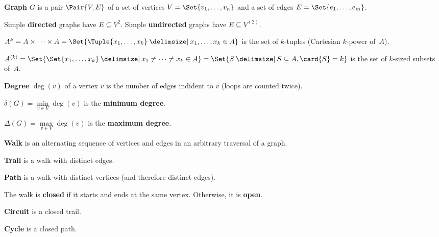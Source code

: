 \documentclass[a4paper,12pt]{article}
\newcommand{\op}[1]{\operatorname*{#1}}
\newcommand{\degree}[1]{\op{deg}(#1)}
\newcommand{\minDegree}[1]{\delta(#1)}
\newcommand{\maxDegree}[1]{\Delta(#1)}
\begin{document}
\begin{terms}
    \item \textbf{Graph} $G$ is a pair $\Pair{V, E}$ of a set of vertices $V = \Set{v_1,\dotsc,v_n}$ and a set of edges $E = \Set{e_1,\dotsc,e_m}$.

    \item Simple \textbf{directed} graphs have $E \subseteq V^{2}$. Simple \textbf{undirected} graphs have $E \subseteq V^{(2)}$.

    \begin{terms}
        \item $A^k = A \times \dotsb \times A = \Set{\Tuple{x_1,\dotsc,x_k} \given x_1,\dotsc,x_k \in A}$ is the set of $k$-tuples (Cartesian $k$-power of~$A$).

        \item $A^{(k)} = \Set{\Set{x_1,\dotsc,x_k} \given x_1 \neq \dotsb \neq x_k \in A} = \Set{ S \given S \subseteq A, \card{S} = k }$ is the set of $k$-sized subsets of~$A$.
    \end{terms}

    \item \textbf{Degree} $\degree{v}$ of a vertex $v$ is the number of edges indident to $v$ (loops are counted twice).
    \begin{terms}
        \item $\minDegree{G} = \min\limits_{v \in V} \degree{v}$ is the \textbf{minimum degree}.
        \item $\maxDegree{G} = \max\limits_{v \in V} \degree{v}$ is the \textbf{maximum degree}.
    \end{terms}


    \item \textbf{Walk} is an alternating sequence of vertices and edges in an arbitrary traversal of a graph.
    \begin{terms}
        \item \textbf{Trail} is a walk with distinct edges.
        \item \textbf{Path} is a walk with distinct vertices (and therefore distinct edges).
        \item The walk is \textbf{closed} if it starts and ends at the same vertex. Otherwise, it is \textbf{open}.
        \item \textbf{Circuit} is a closed trail.
        \item \textbf{Cycle} is a closed path.
    \end{terms}


\end{terms}
\end{document}
